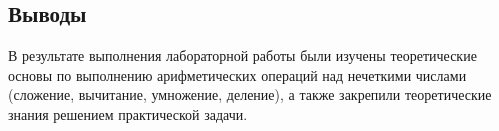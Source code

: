 \subsection{Выводы}

В результате выполнения лабораторной работы были изучены теоретические основы по выполнению арифметических операций над нечеткими числами (сложение, вычитание, умножение, деление), а также закрепили теоретические знания решением практической задачи.


